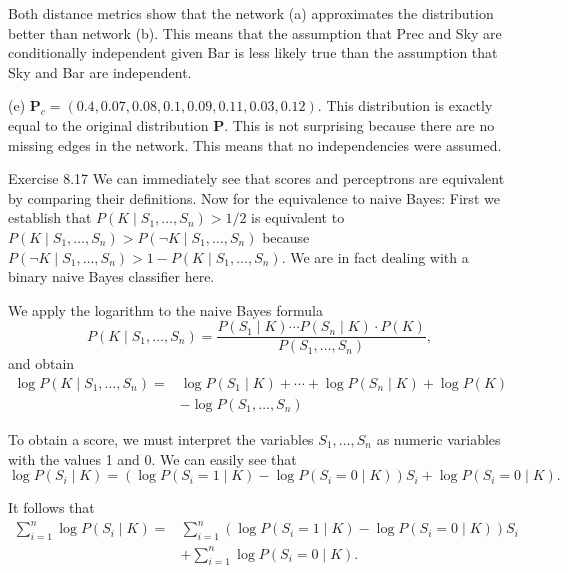 \documentclass[10pt]{book}
\begin{document}
\begin{center}
Both distance metrics show that the network (a) approximates the distribution better than network (b). This means that the assumption that Prec and Sky are conditionally independent given Bar is less likely true than the assumption that Sky and Bar are independent.

(e) $\boldsymbol{P}_{c}=(0.4,0.07,0.08,0.1,0.09,0.11,0.03,0.12)$. This distribution is exactly equal to the original distribution $\boldsymbol{P}$. This is not surprising because there are no missing edges in the network. This means that no independencies were assumed.

Exercise 8.17 We can immediately see that scores and perceptrons are equivalent by comparing their definitions. Now for the equivalence to naive Bayes: First we establish that $P\left(K \mid S_{1}, \ldots, S_{n}\right)>1 / 2$ is equivalent to $P\left(K \mid S_{1}, \ldots, S_{n}\right)>P\left(\neg K \mid S_{1}, \ldots, S_{n}\right)$ because $P\left(\neg K \mid S_{1}, \ldots, S_{n}\right)>1-P\left(K \mid S_{1}, \ldots, S_{n}\right)$. We are in fact dealing with a binary naive Bayes classifier here.

We apply the logarithm to the naive Bayes formula
$$
P\left(K \mid S_{1}, \ldots, S_{n}\right)=\frac{P\left(S_{1} \mid K\right)\cdots P\left(S_{n} \mid K\right)\cdot P(K)}{P\left(S_{1}, \ldots, S_{n}\right)},
$$
and obtain
\begin{equation}
\begin{aligned}
\log P\left(K \mid S_{1}, \ldots, S_{n}\right)= & \log P\left(S_{1} \mid K\right)+\cdots+\log P\left(S_{n} \mid K\right)+\log P(K) \\
& -\log P\left(S_{1}, \ldots, S_{n}\right)
\end{aligned}
\tag{11.18}
\end{equation}

To obtain a score, we must interpret the variables $S_{1}, \ldots, S_{n}$ as numeric variables with the values 1 and 0. We can easily see that
$$
\log P\left(S_{i} \mid K\right)=\left(\log P\left(S_{i}=1 \mid K\right)-\log P\left(S_{i}=0 \mid K\right)\right) S_{i}+\log P\left(S_{i}=0 \mid K\right).
$$

It follows that
$$
\begin{aligned}
\sum_{i=1}^{n} \log P\left(S_{i} \mid K\right)= & \sum_{i=1}^{n}\left(\log P\left(S_{i}=1 \mid K\right)-\log P\left(S_{i}=0 \mid K\right)\right) S_{i} \\
& +\sum_{i=1}^{n} \log P\left(S_{i}=0 \mid K\right).
\end{aligned}
$$


\end{center}
\end{document}

